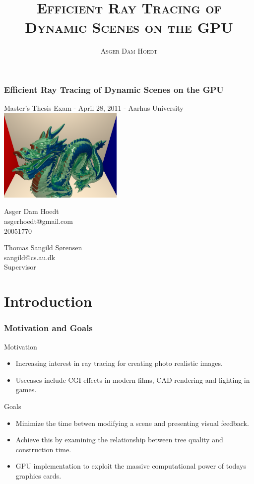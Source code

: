 \documentclass{beamer}
\author{\textsc{Asger Dam Hoedt}}
\title{\textsc{Efficient Ray Tracing of Dynamic Scenes on the GPU}}
\begin{document}

\begin{frame}
  \begin{center}
    \frametitle{Efficient Ray Tracing of Dynamic Scenes on the GPU}
    \footnotesize
    Master's Thesis Exam - April 28, 2011 - Aarhus University
    \vspace*{15pt}\\
    \includegraphics[width=6cm]{semiReflectingDragon}
    \vspace*{20pt}
    \\
    \begin{minipage}{0.4\textwidth}
      \centering
      Asger Dam Hoedt \\ asgerhoedt@gmail.com \\ 20051770
    \end{minipage}
    \begin{minipage}{0.4\textwidth}
      \centering
      Thomas Sangild Sørensen \\ sangild@cs.au.dk \\ Supervisor
    \end{minipage}
  \end{center}
\end{frame}

\section{Introduction}
\begin{frame}
  \frametitle{Motivation and Goals}

  Motivation
  \begin{itemize}
  \item Increasing interest in ray tracing for creating photo realistic images.
  \item Usecases include CGI effects in modern films, CAD rendering and lighting
    in games.
  \end{itemize}

  Goals
  \begin{itemize}
    \item Minimize the time betwen modifying a scene and presenting visual
      feedback.
    \item Achieve this by examining the relationship between tree quality and
      construction time.
    \item GPU implementation to exploit the massive computational power of
      todays graphics cards.
  \end{itemize}
\end{frame}
\end{document}
